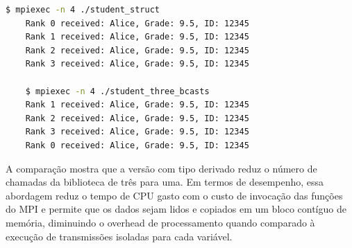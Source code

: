 \documentclass[a4paper, 12pt]{article}
\begin{document}
\begin{lstlisting}[language=bash, caption={Saída do tipo derivado e das três chamadas}, basicstyle=\ttfamily\footnotesize]
    $ mpiexec -n 4 ./student_struct
    Rank 0 received: Alice, Grade: 9.5, ID: 12345
    Rank 1 received: Alice, Grade: 9.5, ID: 12345
    Rank 2 received: Alice, Grade: 9.5, ID: 12345
    Rank 3 received: Alice, Grade: 9.5, ID: 12345

    $ mpiexec -n 4 ./student_three_bcasts
    Rank 1 received: Alice, Grade: 9.5, ID: 12345
    Rank 2 received: Alice, Grade: 9.5, ID: 12345
    Rank 3 received: Alice, Grade: 9.5, ID: 12345
    Rank 0 received: Alice, Grade: 9.5, ID: 12345
\end{lstlisting}

A comparação mostra que a versão com tipo derivado reduz o número de chamadas da biblioteca de três para uma. Em termos de desempenho, essa abordagem reduz o tempo de CPU gasto com o custo de invocação das funções do MPI e permite que os dados sejam lidos e copiados em um bloco contíguo de memória, diminuindo o overhead de processamento quando comparado à execução de transmissões isoladas para cada variável.
\end{document}
